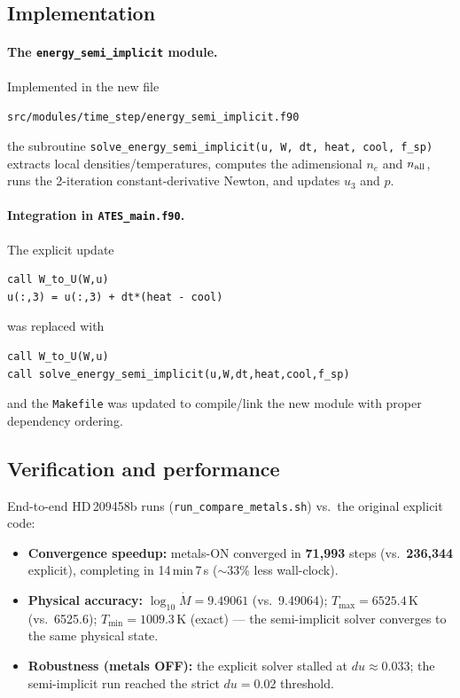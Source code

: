 \documentclass[english,a4paper]{kiseon_memo}
\begin{document}
\subsection{Implementation}
\paragraph{The \texttt{energy\_semi\_implicit} module.} Implemented in the new file
\begin{center}\texttt{src/modules/time\_step/energy\_semi\_implicit.f90}\end{center}
the subroutine \texttt{solve\_energy\_semi\_implicit(u, W, dt, heat, cool, f\_sp)}
extracts local densities/temperatures, computes the adimensional $n_e$ and
$n_{\rm all}$, runs the 2-iteration constant-derivative Newton, and updates $u_3$
and $p$.

\paragraph{Integration in \texttt{ATES\_main.f90}.} The explicit update
\begin{lstlisting}
call W_to_U(W,u)
u(:,3) = u(:,3) + dt*(heat - cool)
\end{lstlisting}
was replaced with
\begin{lstlisting}
call W_to_U(W,u)
call solve_energy_semi_implicit(u,W,dt,heat,cool,f_sp)
\end{lstlisting}
and the \texttt{Makefile} was updated to compile/link the new module with proper
dependency ordering.

\subsection{Verification and performance}
End-to-end HD\,209458b runs (\texttt{run\_compare\_metals.sh}) vs.\ the original
explicit code:
\begin{itemize}
  \item \textbf{Convergence speedup:} metals-ON converged in \textbf{71{,}993}
    steps (vs.\ \textbf{236{,}344} explicit), completing in 14\,min\,7\,s
    ($\sim$33\% less wall-clock).
  \item \textbf{Physical accuracy:} $\log_{10}\dot M = 9.49061$ (vs.\ 9.49064);
    $T_{\max}=6525.4$\,K (vs.\ 6525.6); $T_{\min}=1009.3$\,K (exact) --- the
    semi-implicit solver converges to the same physical state.
  \item \textbf{Robustness (metals OFF):} the explicit solver stalled at
    $du\approx0.033$; the semi-implicit run reached the strict $du=0.02$ threshold.
\end{itemize}
\end{document}
